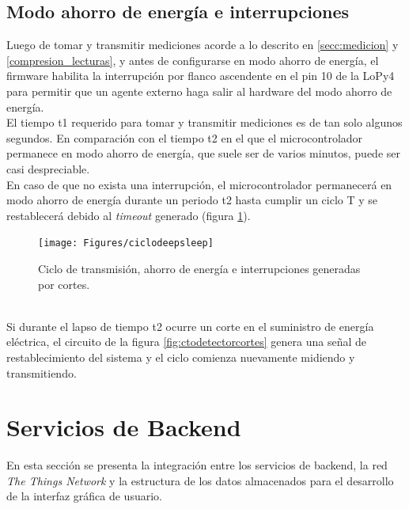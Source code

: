 \subsection{Modo ahorro de energía e interrupciones}
Luego de tomar y transmitir mediciones acorde a lo descrito en \ref{secc:medicion} y \ref{compresion_lecturas}, y antes de configurarse en modo ahorro de energía, el firmware habilita la interrupción por flanco ascendente en el pin 10 de la LoPy4 para permitir que un agente externo haga salir al hardware del modo ahorro de energ\'{i}a.\\
El tiempo t1 requerido para tomar y transmitir mediciones es de tan solo algunos segundos. En comparación con el tiempo t2 en el que el microcontrolador permanece en modo ahorro de energía, que suele ser de varios minutos, puede ser casi despreciable.\\ 
En caso de que no exista una interrupción, el microcontrolador permanecerá en modo ahorro de energía durante un periodo t2 hasta cumplir un ciclo T y se restablecerá debido al \textit{timeout} generado (figura \ref{fig:ciclodeepsleep}).\\
\begin{figure}
	\centering
	\texttt{[image: Figures/ciclodeepsleep]}
	\caption{Ciclo de transmisión, ahorro de energía e interrupciones generadas por cortes.}
	\label{fig:ciclodeepsleep}
\end{figure}\\
Si durante el lapso de tiempo t2 ocurre un corte en el suministro de energ\'{i}a el\'{e}ctrica, el circuito de la figura \ref{fig:ctodetectorcortes} genera una señal de restablecimiento del sistema y el ciclo comienza nuevamente midiendo y transmitiendo.\\


\section{Servicios de Backend}
\label{seccion_bes}
En esta sección se presenta la integración entre los servicios de backend, la red \textit{The Things Network} y la estructura de los datos almacenados para el desarrollo de la interfaz gráfica de usuario.\\
